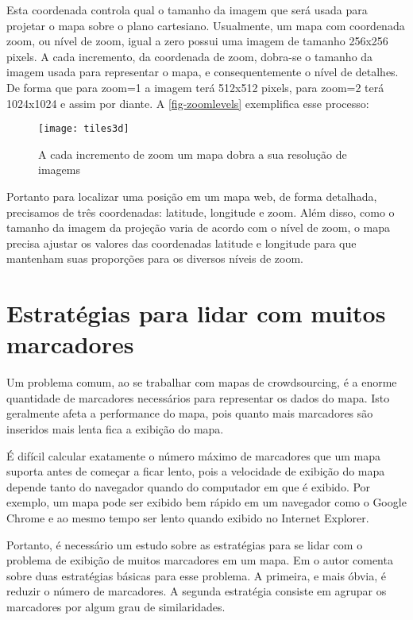 	 Esta  coordenada controla qual o tamanho da imagem que será usada para projetar o mapa sobre o plano cartesiano. Usualmente, um mapa com coordenada zoom, ou nível de zoom, igual a zero possui uma imagem de tamanho 256x256 pixels. A cada incremento, da coordenada de zoom, dobra-se o tamanho da imagem usada para representar o mapa, e consequentemente o nível de detalhes. De forma que  para zoom=1 a imagem terá 512x512 pixels, para zoom=2 terá 1024x1024 e assim por diante. A \autoref{fig-zoomlevels} exemplifica esse processo:
	\begin{figure}[htb]
	\caption{\label{fig-zoomlevels} A cada incremento de zoom um mapa dobra a sua resolução de imagems}
	\begin{center}
	    \texttt{[image: tiles3d]}
	\end{center}
	\end{figure}

	Portanto para localizar uma posição  em um mapa web, de forma detalhada, precisamos de três coordenadas: latitude, longitude e zoom. Além disso, como o tamanho da imagem da projeção varia de acordo com o nível de zoom, o mapa precisa ajustar os valores das coordenadas latitude e longitude para que mantenham suas proporções para os diversos níveis de zoom.

\section{Estratégias para lidar com muitos marcadores}
	Um problema comum, ao se trabalhar com mapas de crowdsourcing, é a enorme quantidade de marcadores necessários para representar os dados do mapa. Isto geralmente afeta a performance do mapa, pois quanto mais marcadores são inseridos mais lenta fica a exibição do mapa. 
	
	É difícil calcular exatamente o número máximo de marcadores que um mapa suporta antes de começar a ficar lento, pois a velocidade de exibição do mapa depende tanto do navegador quando do computador em que é exibido. Por exemplo, um mapa pode ser exibido bem rápido em um navegador como o Google Chrome e ao mesmo tempo ser lento quando exibido no Internet Explorer.\cite[177]{livroGoogleApiV3}
	
    Portanto, é necessário um estudo sobre as  estratégias para se lidar com o problema de exibição de muitos marcadores em um mapa. Em \cite[capítulo~9]{livroGoogleApiV3} o autor comenta sobre duas estratégias básicas para esse problema. A primeira, e mais óbvia, é reduzir o número de marcadores. A segunda estratégia consiste em agrupar os marcadores por algum grau de similaridades.
    
